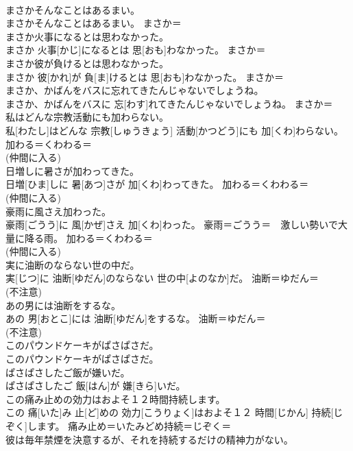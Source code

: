 \documentclass[8pt]{extreport}
\begin{document}
\begin{CJK}{UTF8}{min}
{\\	まさかそんなことはあるまい。	
\\	まさかそんなことはあるまい。	まさか＝ 
\\	まさか火事になるとは思わなかった。	
\\	まさか 火事[かじ]になるとは 思[おも]わなかった。	まさか＝ 
\\	まさか彼が負けるとは思わなかった。	
\\	まさか 彼[かれ]が 負[ま]けるとは 思[おも]わなかった。	まさか＝ 
\\	まさか、かばんをバスに忘れてきたんじゃないでしょうね。	
\\	まさか、かばんをバスに 忘[わす]れてきたんじゃないでしょうね。	まさか＝ 
\\	私はどんな宗教活動にも加わらない。	
\\	私[わたし]はどんな 宗教[しゅうきょう] 活動[かつどう]にも 加[くわ]わらない。	加わる＝くわわる＝ 
\\	(仲間に入る) 
\\	日増しに暑さが加わってきた。	
\\	日増[ひま]しに 暑[あつ]さが 加[くわ]わってきた。	加わる＝くわわる＝ 
\\	(仲間に入る) 
\\	豪雨に風さえ加わった。	
\\	豪雨[ごうう]に 風[かぜ]さえ 加[くわ]わった。	豪雨＝ごうう＝　激しい勢いで大量に降る雨。 加わる＝くわわる＝ 
\\	(仲間に入る) 
\\	実に油断のならない世の中だ。	
\\	実[じつ]に 油断[ゆだん]のならない 世の中[よのなか]だ。	油断＝ゆだん＝ 
\\	(不注意) 
\\	あの男には油断をするな。	
\\	あの 男[おとこ]には 油断[ゆだん]をするな。	油断＝ゆだん＝ 
\\	(不注意) 
\\	このパウンドケーキがぱさぱさだ。	
\\	このパウンドケーキがぱさぱさだ。	
\\	ぱさぱさしたご飯が嫌いだ。	
\\	ぱさぱさしたご 飯[はん]が 嫌[きら]いだ。	
\\	この痛み止めの効力はおよそ１２時間持続します。	
\\	この 痛[いた]み 止[ど]めの 効力[こうりょく]はおよそ１２ 時間[じかん] 持続[じぞく]します。	痛み止め＝いたみどめ持続＝じぞく＝ 
\\	彼は毎年禁煙を決意するが、それを持続するだけの精神力がない。	
}
\end{CJK}
\end{document}
